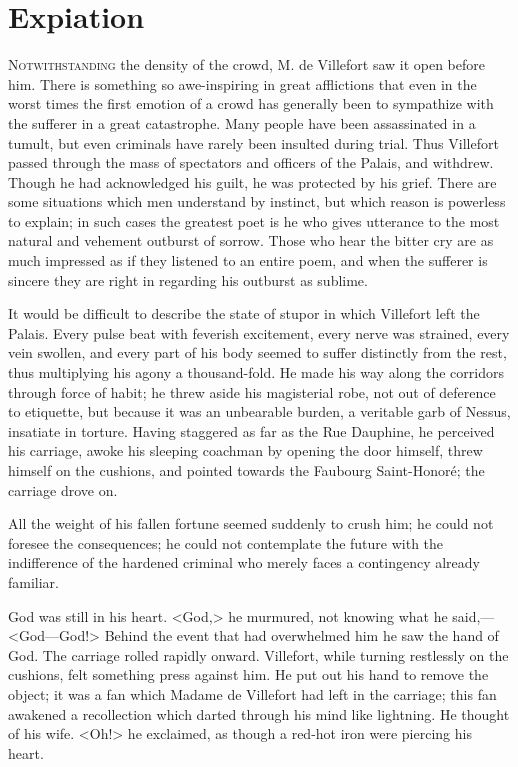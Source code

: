 \chapter{Expiation} 

 \lettrine{N}{otwithstanding} the density of the crowd, M. de Villefort saw it open before him. There is something so awe-inspiring in great afflictions that even in the worst times the first emotion of a crowd has generally been to sympathize with the sufferer in a great catastrophe. Many people have been assassinated in a tumult, but even criminals have rarely been insulted during trial. Thus Villefort passed through the mass of spectators and officers of the Palais, and withdrew. Though he had acknowledged his guilt, he was protected by his grief. There are some situations which men understand by instinct, but which reason is powerless to explain; in such cases the greatest poet is he who gives utterance to the most natural and vehement outburst of sorrow. Those who hear the bitter cry are as much impressed as if they listened to an entire poem, and when the sufferer is sincere they are right in regarding his outburst as sublime. 

 It would be difficult to describe the state of stupor in which Villefort left the Palais. Every pulse beat with feverish excitement, every nerve was strained, every vein swollen, and every part of his body seemed to suffer distinctly from the rest, thus multiplying his agony a thousand-fold. He made his way along the corridors through force of habit; he threw aside his magisterial robe, not out of deference to etiquette, but because it was an unbearable burden, a veritable garb of Nessus, insatiate in torture. Having staggered as far as the Rue Dauphine, he perceived his carriage, awoke his sleeping coachman by opening the door himself, threw himself on the cushions, and pointed towards the Faubourg Saint-Honoré; the carriage drove on. 

 All the weight of his fallen fortune seemed suddenly to crush him; he could not foresee the consequences; he could not contemplate the future with the indifference of the hardened criminal who merely faces a contingency already familiar. 

 

 God was still in his heart. <God,> he murmured, not knowing what he said,—<God—God!> Behind the event that had overwhelmed him he saw the hand of God. The carriage rolled rapidly onward. Villefort, while turning restlessly on the cushions, felt something press against him. He put out his hand to remove the object; it was a fan which Madame de Villefort had left in the carriage; this fan awakened a recollection which darted through his mind like lightning. He thought of his wife.  <Oh!> he exclaimed, as though a red-hot iron were piercing his heart. 

